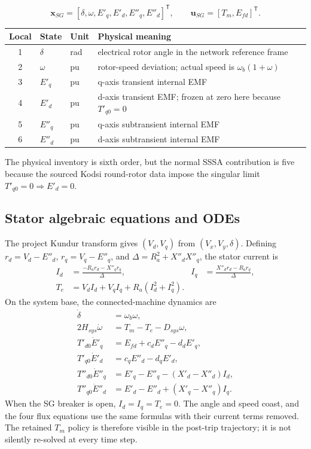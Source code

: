\documentclass[12pt,a4paper]{article}
\newcommand{\vect}[1]{\boldsymbol{#1}}
\begin{document}
\[
\vect x_{SG}=[\delta,\omega,E'_q,E'_d,E''_q,E''_d]^{\mathsf T},\qquad
\vect u_{SG}=[T_m,E_{fd}]^{\mathsf T}.
\]
\begin{center}\small
\begin{tabularx}{\textwidth}{c l l X}
\toprule
Local & State & Unit & Physical meaning\\\midrule
1 & \(\delta\) & rad & electrical rotor angle in the network reference frame\\
2 & \(\omega\) & pu & rotor-speed deviation; actual speed is \(\omega_b(1+\omega)\)\\
3 & \(E'_q\) & pu & q-axis transient internal EMF\\
4 & \(E'_d\) & pu & d-axis transient EMF; frozen at zero here because \(T'_{q0}=0\)\\
5 & \(E''_q\) & pu & q-axis subtransient internal EMF\\
6 & \(E''_d\) & pu & d-axis subtransient internal EMF\\
\bottomrule
\end{tabularx}
\end{center}
The physical inventory is sixth order, but the normal SSSA contribution is
five because the sourced Kodsi round-rotor data impose the singular limit
\(T'_{q0}=0\Rightarrow E'_d=0\).

\subsection{Stator algebraic equations and ODEs}

The project Kundur transform gives \((V_d,V_q)\) from \((V_x,V_y,\delta)\).
Defining \(r_d=V_d-E''_d\), \(r_q=V_q-E''_q\), and
\(\Delta=R_a^2+X''_dX''_q\), the stator current is
\begin{align}
I_d&=\frac{-R_a r_d-X''_q r_q}{\Delta},&
I_q&=\frac{ X''_d r_d-R_a r_q}{\Delta},\\
T_e&=V_dI_d+V_qI_q+R_a(I_d^2+I_q^2).
\end{align}
On the system base, the connected-machine dynamics are
\begin{align}
\dot\delta&=\omega_b\omega,\\
2H_{sys}\dot\omega&=T_m-T_e-D_{sys}\omega,\\
T'_{d0}\dot E'_q&=E_{fd}+c_dE''_q-d_dE'_q,\\
T'_{q0}\dot E'_d&=c_qE''_d-d_qE'_d,\\
T''_{d0}\dot E''_q&=E'_q-E''_q-(X'_d-X''_d)I_d,\\
T''_{q0}\dot E''_d&=E'_d-E''_d+(X'_q-X''_q)I_q.
\end{align}
When the SG breaker is open, \(I_d=I_q=T_e=0\).  The angle and speed coast,
and the four flux equations use the same formulas with their current terms
removed.  The retained \(T_m\) policy is therefore visible in the post-trip
trajectory; it is not silently re-solved at every time step.
\end{document}
